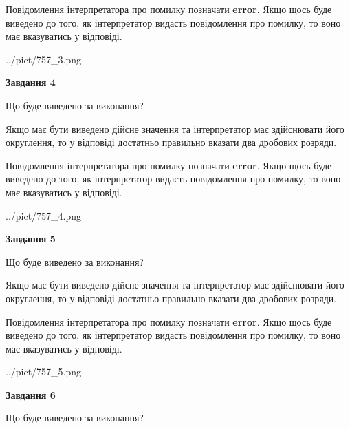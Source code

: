 \documentclass[12pt, ukrainian]{article}
\begin{document}
{\begin {Large}
Повідомлення інтерпретатора про помилку позначати \textbf{error}.
Якщо щось буде виведено до того, як інтерпретатор видасть повідомлення про помилку, 
то воно має вказуватись у відповіді. \par

\begin{center}
	{../pict/757_3.png}
\end{center}
\newpage

{\begin {center}\textbf{Завдання 4}\end {center}}\par
Що буде виведено за виконання? \par

Якщо має бути виведено дійсне значення та інтерпретатор має здійснювати його округлення, 
то у відповіді достатньо правильно вказати два дробових розряди.

Повідомлення інтерпретатора про помилку позначати \textbf{error}.
Якщо щось буде виведено до того, як інтерпретатор видасть повідомлення про помилку, 
то воно має вказуватись у відповіді. \par

\begin{center}
	{../pict/757_4.png}
\end{center}
\newpage

{\begin {center}\textbf{Завдання 5}\end {center}}\par
Що буде виведено за виконання? \par

Якщо має бути виведено дійсне значення та інтерпретатор має здійснювати його округлення, 
то у відповіді достатньо правильно вказати два дробових розряди.

Повідомлення інтерпретатора про помилку позначати \textbf{error}.
Якщо щось буде виведено до того, як інтерпретатор видасть повідомлення про помилку, 
то воно має вказуватись у відповіді. \par

\begin{center}
	{../pict/757_5.png}
\end{center}
\newpage

{\begin {center}\textbf{Завдання 6}\end {center}}\par
Що буде виведено за виконання? \par


\end{Large}}
\end{document}
